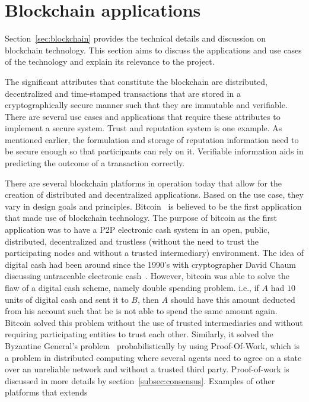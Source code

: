 \section{Blockchain applications}
Section~\ref{sec:blockchain} provides the technical details and discussion on
blockchain technology. This section aims to discuss the applications and use
cases of the technology and explain its relevance to the project. \par
The significant attributes that constitute the blockchain are distributed,
decentralized and time-stamped transactions that are stored in a
cryptographically secure manner such that they are immutable and verifiable.
There are several use cases and applications that require these attributes to
implement a secure system. Trust and reputation system is one example. As
mentioned earlier, the formulation and storage of reputation information need
to be secure enough so that participants can rely on it. Verifiable information
aids in predicting the outcome of a transaction correctly. \par
There are several blockchain platforms in operation today that allow for the
creation of distributed and decentralized applications. Based on the use case,
they vary in design goals and principles. Bitcoin~\cite{Bitcoin_Satoshi} is
believed to be the first application that made use of blockchain technology.
The purpose of bitcoin as the first application was to have a P2P electronic
cash system in an open, public, distributed, decentralized and trustless
(without the need to trust the participating nodes and without a trusted
intermediary) environment. The idea of digital cash had been around since the
1990's with cryptographer David Chaum discussing untraceable electronic
cash~\cite{chaum1988untraceable}. However, bitcoin was able to solve the flaw
of a digital cash scheme, namely double spending problem. i.e., if $A$ had $10$
units of digital cash and sent it to $B$, then $A$ should have this amount
deducted from his account such that he is not able to spend the same amount
again. Bitcoin solved this problem without the use of trusted intermediaries
and without requiring participating entities to trust each other. Similarly, it
solved the Byzantine General's
problem~\cite{lamport1982byzantine,miller2014anonymous} probabilistically by
using Proof-Of-Work, which is a problem in distributed computing where several
agents need to agree on a state over an unreliable network and without a
trusted third party. Proof-of-work is discussed in more details by
section~\ref{subsec:consensus}. Examples of other platforms that extends
